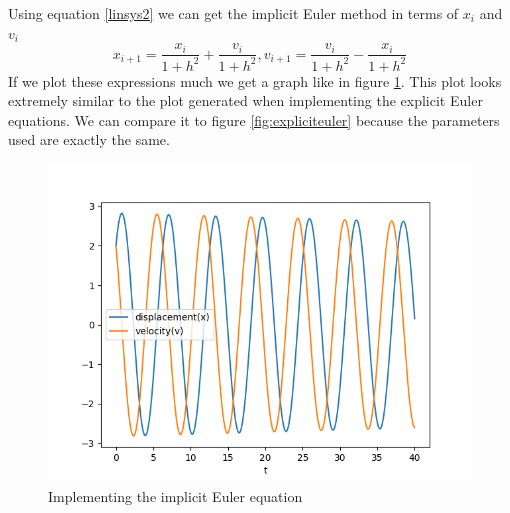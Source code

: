 \documentclass{article}
\begin{document}
Using equation \ref{linsys2} we can get the implicit Euler method in terms of $x_i$ and $v_i$
\begin{equation}
    x_{i+1}=\frac{x_i}{1+h^2}+\frac{v_i}{1+h^2}, v_{i+1}=\frac{v_i}{1+h^2}-\frac{x_i}{1+h^2}
\end{equation}
If we plot these expressions much we get a graph like in figure \ref{fig:impliciteuler}. This plot looks extremely similar to the plot generated when implementing the explicit Euler equations. We can compare it to figure \ref{fig:expliciteuler} because the parameters used are exactly the same. 
\begin{figure}[h]
    \centering
    \includegraphics[width = \textwidth]{Images/impliciteuler.png}
    \caption{Implementing the implicit Euler equation}
    \label{fig:impliciteuler}
\end{figure}
\end{document}
